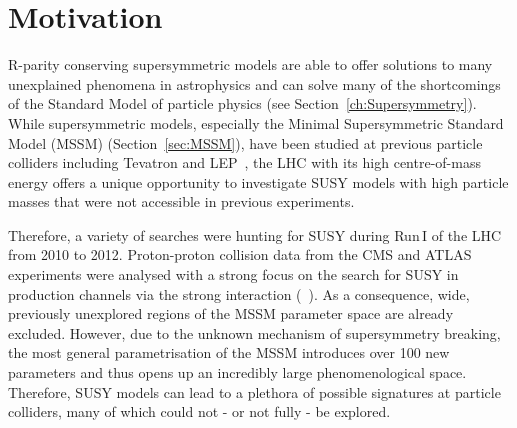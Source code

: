 \FloatBarrier
\chapter{Motivation}
\label{sec:Motivation}
R-parity conserving supersymmetric models are able to offer solutions to many unexplained phenomena in astrophysics and can solve many of the shortcomings of the Standard Model of particle physics (see Section~\ref{ch:Supersymmetry}).
While supersymmetric models, especially the Minimal Supersymmetric Standard Model (MSSM) (Section~\ref{sec:MSSM}), have been studied at previous particle colliders including Tevatron and LEP~\cite{bib:Tevatron:SUSY_results,bib:LEP:SUSY_results}, the LHC with its high centre-of-mass energy offers a unique opportunity to investigate SUSY models with high particle masses that were not accessible in previous experiments.

Therefore, a variety of searches were hunting for SUSY during Run\,I of the LHC from 2010 to 2012.
Proton-proton collision data from the CMS and ATLAS experiments were analysed with a strong focus on the search for SUSY in production channels via the strong interaction (\eg~\cite{bib:CMS:RA2_8TeV,bib:CMS:MT2_8TeV,bib:ATLAS:JetPlusMET_8TeV}).
As a consequence, wide, previously unexplored regions of the MSSM parameter space are already excluded.
However, due to the unknown mechanism of supersymmetry breaking, the most general parametrisation of the MSSM introduces over 100 new parameters and thus opens up an incredibly large phenomenological space. 
Therefore, SUSY models can lead to a plethora of possible signatures at particle colliders, many of which could not - or not fully - be explored. \\


